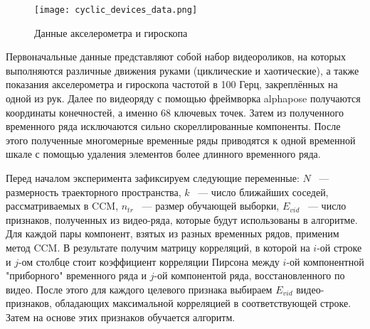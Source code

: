 \documentclass[a4paper, 12pt]{article}
\begin{document}
\begin{figure}[bhtp]
	\texttt{[image: cyclic\_devices\_data.png]}
	\caption{Данные акселерометра и гироскопа}
	\label{fig:devices_data}
\end{figure}
Первоначальные данные представляют собой набор видеороликов, на которых выполняются различные движения руками (циклические и хаотические), а также показания акселерометра и гироскопа частотой в 100 Герц, закреплённых на одной из рук. 
Далее по видеоряду с помощью фреймворка alphapose \citep{alphapose_fang2017rmpe, alphapose_li2018crowdpose, alphapose_xiu2018poseflow} получаются координаты конечностей, а именно 68 ключевых точек. 
Затем из полученного временного ряда исключаются сильно скореллированные компоненты.
После этого полученные многомерные временные ряды приводятся к одной временной шкале с помощью удаления элементов более длинного временного ряда.

Перед началом эксперимента зафиксируем следующие переменные: $N$ ~--- размерность траекторного пространства, $k$ ~--- число ближайших соседей, рассматриваемых в CCM, $n_{tr}$ ~--- размер обучающей выборки, $E_{vid}$ ~--- число признаков, полученных из видео-ряда, которые будут использованы в алгоритме.
Для каждой пары компонент, взятых из разных временных рядов, применим метод CCM.
В результате получим матрицу корреляций, в которой на $i\text{-ой}$ строке и $j\text{-ом}$ столбце стоит коэффициент корреляции Пирсона между $i\text{-ой}$ компонентной "приборного" временного ряда и $j\text{-ой}$ компонентой ряда, восстановленного по видео. 
После этого для каждого целевого признака выбираем $E_{vid}$ видео-признаков, обладающих максимальной корреляцией в соответствующей строке.
Затем на основе этих признаков обучается алгоритм.

\begin{figure}[bhtp]
	\centering
	\label{fig:video_data}
\end{figure}
\end{document}

